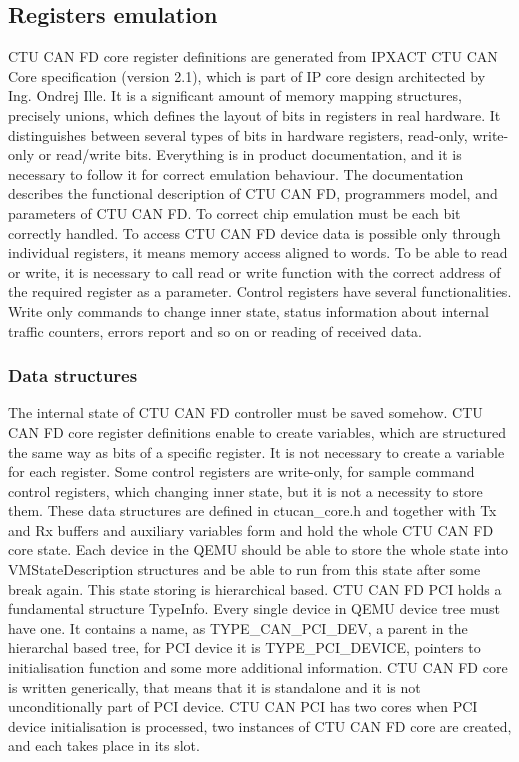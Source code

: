 \documentclass{ctuthesis}
\begin{document}
 \subsection{Registers emulation}
  CTU CAN FD core register definitions are generated from IPXACT CTU CAN Core specification (version 2.1), which is part of IP core design architected by Ing. Ondrej Ille. It is a significant amount of memory mapping structures, precisely unions, which defines the layout of bits in registers in real hardware. It distinguishes between several types of bits in hardware registers, read-only, write-only or read/write bits. Everything is in product documentation, and it is necessary to follow it for correct emulation behaviour. The documentation describes the functional description of CTU CAN FD, programmers model, and parameters of CTU CAN FD. To correct chip emulation must be each bit correctly handled. To access CTU CAN FD device data is possible only through individual registers, it means memory access aligned to words. To be able to read or write, it is necessary to call read or write function with the correct address of the required register as a parameter.
  Control registers have several functionalities. Write only commands to change inner state, status information about internal traffic counters, errors report and so on or reading of received data.
 
  \subsubsection{Data structures}
  The internal state of CTU CAN FD controller must be saved somehow. CTU CAN FD core register definitions enable to create variables, which are structured the same way as bits of a specific register. It is not necessary to create a variable for each register. Some control registers are write-only, for sample command control registers, which changing inner state, but it is not a necessity to store them. These data structures are defined in ctucan\_core.h and together with Tx and Rx buffers and auxiliary variables form and hold the whole CTU CAN FD core state.
  Each device in the QEMU should be able to store the whole state into VMStateDescription structures and be able to run from this state after some break again. This state storing is hierarchical based. 
  CTU CAN FD PCI holds a fundamental structure TypeInfo. Every single device in QEMU device tree must have one. It contains a name, as TYPE\_CAN\_PCI\_DEV, a parent in the hierarchal based tree, for PCI device it is TYPE\_PCI\_DEVICE, pointers to initialisation function and some more additional information. CTU CAN FD core is written generically, that means that it is standalone and it is not unconditionally part of PCI device. CTU CAN PCI has two cores when PCI device initialisation is processed, two instances of CTU CAN FD core are created, and each takes place in its slot.
 
\end{document}

